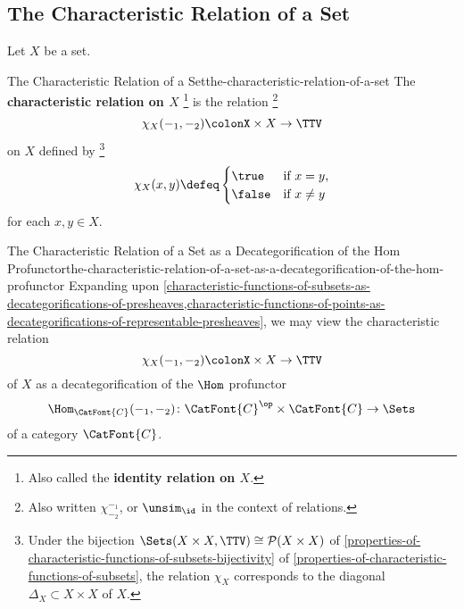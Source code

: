 \subsection{The Characteristic Relation of a Set}\label{subsection-the-characteristic-relation-of-a-set}
Let $X$ be a set.
\begin{definition}{The Characteristic Relation of a Set}{the-characteristic-relation-of-a-set}%
    The \textbf{characteristic relation on $X$}%
    \footnote{%
        Also called the \textbf{identity relation on $X$}.
    } %
    is the relation%
    \footnote{%
        Also written $\chi^{-_{1}}_{-_{2}}$, or $\unsim_{\id}$ in the context of relations.
    }%
    \[%
        \chi_{X}(-_{1},-_{2})%
        \colon%
        X\times X%
        \to%
        \TTV%
    \]%
    on $X$ defined by%
    \footnote{%
        Under the bijection $\Sets(X\times X,\TTV)\cong\mathcal{P}(X\times X)$ of \cref{properties-of-characteristic-functions-of-subsets-bijectivity} of \cref{properties-of-characteristic-functions-of-subsets}, the relation $\chi_{X}$ corresponds to the diagonal $\Delta_{X}\subset X\times X$ of $X$.
        \par\vspace*{\TCBBoxCorrection}
    } %
    \[
        \chi_{X}(x,y)
        \defeq
        \begin{cases}
            \true  &\text{if $x=y$,}\\
            \false &\text{if $x\neq y$}
        \end{cases}
    \]%
    for each $x,y\in X$.
\end{definition}
\begin{remark}{The Characteristic Relation of a Set as a Decategorification of the Hom Profunctor}{the-characteristic-relation-of-a-set-as-a-decategorification-of-the-hom-profunctor}%
    Expanding upon \cref{characteristic-functions-of-subsets-as-decategorifications-of-presheaves,characteristic-functions-of-points-as-decategorifications-of-representable-presheaves}, we may view the characteristic relation%
    \[%
        \chi_{X}(-_{1},-_{2})%
        \colon%
        X\times X%
        \to%
        \TTV%
    \]%
    of $X$ as a decategorification of the $\Hom$ profunctor
    \[
        \Hom_{\CatFont{C}}(-_{1},-_{2})%
        \colon%
        \CatFont{C}^{\op}\times\CatFont{C}%
        \to%
        \Sets%
    \]%
    of a category $\CatFont{C}$.
\end{remark}
